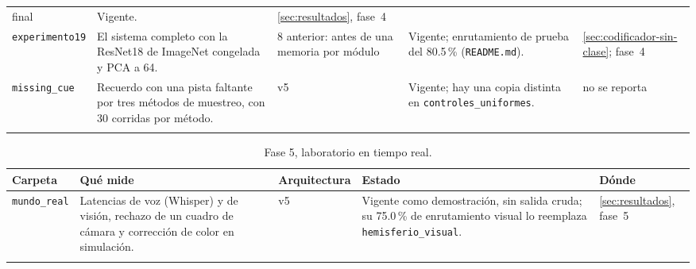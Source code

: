 \begin{table}[H]
\begin{tabular}{p{3.1cm}p{4.7cm}p{2.0cm}p{3.1cm}p{1.6cm}}
\raggedright final &
\raggedright Vigente. &
\raggedright \ref{sec:resultados}, fase~4 \tabularnewline\addlinespace[4pt]
\raggedright \texttt{experimento19} &
\raggedright El sistema completo con la ResNet18 de ImageNet congelada y PCA a 64. &
\raggedright 8 anterior: antes de una memoria por módulo &
\raggedright Vigente; enrutamiento de prueba del 80.5\,\% (\texttt{README.md}). &
\raggedright \ref{sec:codificador-sin-clase}; fase~4 \tabularnewline\addlinespace[4pt]
\raggedright \texttt{missing\_\allowbreak cue} &
\raggedright Recuerdo con una pista faltante por tres métodos de muestreo, con 30 corridas por método. &
\raggedright v5 &
\raggedright Vigente; hay una copia distinta en \texttt{controles\_\allowbreak uniformes}. &
\raggedright no se reporta \tabularnewline\addlinespace[4pt]
\bottomrule
\end{tabular}
\end{table}

\begin{table}[H]
\centering
\caption[Fase 5, laboratorio en tiempo real]{Fase 5, laboratorio en tiempo real.}
\label{tab:fase5-experimentos}
\footnotesize
\setlength{\tabcolsep}{3pt}
\begin{tabular}{p{3.1cm}p{4.7cm}p{2.0cm}p{3.1cm}p{1.6cm}}
\toprule
Carpeta & Qué mide & Arquitectura & Estado & Dónde \tabularnewline
\midrule
\raggedright \texttt{mundo\_\allowbreak real} &
\raggedright Latencias de voz (Whisper) y de visión, rechazo de un cuadro de cámara y corrección de color en simulación. &
\raggedright v5 &
\raggedright Vigente como demostración, sin salida cruda; su 75.0\,\% de enrutamiento visual lo reemplaza \texttt{hemisferio\_\allowbreak visual}. &
\raggedright \ref{sec:resultados}, fase~5 \tabularnewline\addlinespace[4pt]
\bottomrule
\end{tabular}
\end{table}

